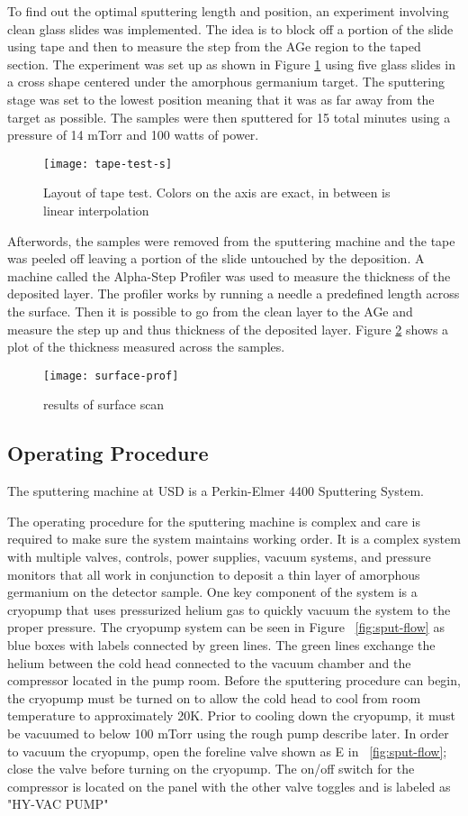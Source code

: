 To find out the optimal sputtering length and position, an experiment involving clean glass slides was implemented.
The idea is to block off a portion of the slide using tape and then to measure the step from the AGe region to the taped section.
The experiment was set up as shown in Figure \ref{fig:tape-test-s} using five glass slides in a cross shape centered under the amorphous germanium target.
The sputtering stage was set to the lowest position meaning that it was as far away from the target as possible.
The samples were then sputtered for 15 total minutes using a pressure of 14 mTorr and 100 watts of power.
\begin{figure}[htpb]
\centering
\texttt{[image: tape-test-s]}
\caption{Layout of tape test. Colors on the axis are exact, in between is linear interpolation }
\label{fig:tape-test-s}
\end{figure}

Afterwords, the samples were removed from the sputtering machine and the tape was peeled off leaving a portion of the slide untouched by the deposition.
A machine called the Alpha-Step Profiler was used to measure the thickness of the deposited layer.
The profiler works by running a needle a predefined length across the surface.
Then it is possible to go from the clean layer to the AGe and measure the step up and thus thickness of the deposited layer.
Figure \ref{fig:surface-prof} shows a plot of the thickness measured across the samples.
\begin{figure}[htpb]
\centering
\texttt{[image: surface-prof]}
\caption{results of surface scan}
\label{fig:surface-prof}
\end{figure}

\subsection{Operating Procedure}
The sputtering machine at USD is a Perkin-Elmer 4400 Sputtering System.

The operating procedure for the sputtering machine is complex and care is required to make sure the system maintains working order.
It is a complex system with multiple valves, controls, power supplies, vacuum systems, and pressure monitors that all work in conjunction to deposit a thin layer of amorphous germanium on the detector sample.
One key component of the system is a cryopump that uses pressurized helium gas to quickly vacuum the system to the proper pressure.
The cryopump system can be seen in Figure ~\ref{fig:sput-flow} as blue boxes with labels connected by green lines.
The green lines exchange the helium between the cold head connected to the vacuum chamber and the compressor located in the pump room.
Before the sputtering procedure can begin, the cryopump must be turned on to allow the cold head to cool from room temperature to approximately 20K.
Prior to cooling down the cryopump, it must be vacuumed to below 100 mTorr using the rough pump describe later.
In order to vacuum the cryopump, open the foreline valve shown as E in ~\ref{fig:sput-flow}; close the valve before turning on the cryopump.
The on/off switch for the compressor is located on the panel with the other valve toggles and is labeled as "HY-VAC PUMP"

